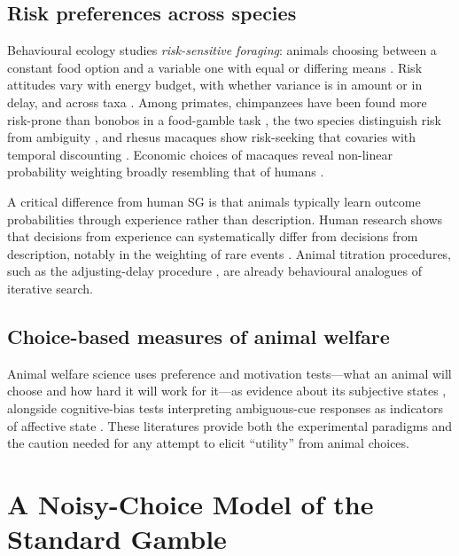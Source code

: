 \documentclass[11pt,a4paper]{article}
\begin{document}
\subsection{Risk preferences across species}

Behavioural ecology studies \emph{risk-sensitive foraging}: animals choosing between a constant food option and a variable one with equal or differing means \citep{caraco1980,stephens1986,kacelnik1996}. Risk attitudes vary with energy budget, with whether variance is in amount or in delay, and across taxa \citep{kacelnik1996}. Among primates, chimpanzees have been found more risk-prone than bonobos in a food-gamble task \citep{heilbronner2008}, the two species distinguish risk from ambiguity \citep{rosati2011}, and rhesus macaques show risk-seeking that covaries with temporal discounting \citep{hayden2007}. Economic choices of macaques reveal non-linear probability weighting broadly resembling that of humans \citep{stauffer2015}.

A critical difference from human SG is that animals typically learn outcome probabilities through experience rather than description. Human research shows that decisions from experience can systematically differ from decisions from description, notably in the weighting of rare events \citep{hertwig2004}. Animal titration procedures, such as the adjusting-delay procedure \citep{mazur1987}, are already behavioural analogues of iterative search.

\subsection{Choice-based measures of animal welfare}

Animal welfare science uses preference and motivation tests---what an animal will choose and how hard it will work for it---as evidence about its subjective states \citep{dawkins1990,kirkden2003}, alongside cognitive-bias tests interpreting ambiguous-cue responses as indicators of affective state \citep{harding2004,mendl2010}. These literatures provide both the experimental paradigms and the caution needed for any attempt to elicit ``utility'' from animal choices.

\section{A Noisy-Choice Model of the Standard Gamble}
\label{sec:model}
\end{document}
